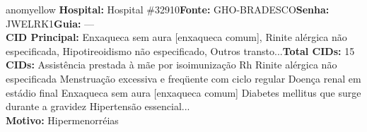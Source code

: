 \documentclass[a4paper,10pt]{article}
\begin{document}
\begin{anomalycard}[Interna\c{c}\~{a}o \#120320 | Pac. \#99748 | MODERADO (z=2.35) | LOS: 5d | 04/03/2026\,$\to$\,09/03/2026]{anomyellow}
\textbf{Hospital:} Hospital \#32910\quad \textbf{Fonte:} GHO-BRADESCO\quad \textbf{Senha:} JWELRK1\quad \textbf{Guia:} ---\\

\textbf{CID Principal:} {\small Enxaqueca sem aura [enxaqueca comum], Rinite alérgica não especificada, Hipotireoidismo não especificado, Outros transto...}\quad\textbf{Total CIDs:} 15\\

\textbf{CIDs:} {\scriptsize Assistência prestada à mãe por isoimunização Rh \textbar{} Rinite alérgica não especificada \textbar{} Menstruação excessiva e freqüente com ciclo regular \textbar{} Doença renal em estádio final \textbar{} Enxaqueca sem aura [enxaqueca comum] \textbar{} Diabetes mellitus que surge durante a gravidez \textbar{} Hipertensão essencial...}\\

\textbf{Motivo:} {\scriptsize Hipermenorréias}\\




\end{anomalycard}
\end{document}
